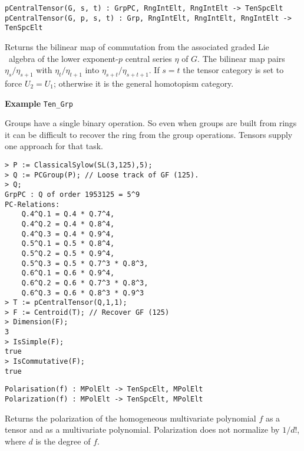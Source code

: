 \color{blue}
{\small \begin{verbatim}
pCentralTensor(G, s, t) : GrpPC, RngIntElt, RngIntElt -> TenSpcElt
pCentralTensor(G, p, s, t) : Grp, RngIntElt, RngIntElt, RngIntElt -> TenSpcElt
\end{verbatim} }
\color{black}

Returns the bilinear map of commutation from the associated graded Lie \
algebra of the lower exponent-$p$ central
series $\eta$ of $G$.  The bilinear map pairs $\eta_s/\eta_{s+1}$ with $
\eta_{t}/\eta_{t+1}$ into $\eta_{s+t}/\eta_{s+t+1}$.  If $s=t$ the tensor 
category is set to force $U_2=U_1$; 
otherwise it is the general homotopism category.

\medskip
\begin{framed} {\bf Example} {\tt Ten\_Grp}\\
{\small
Groups have a single binary operation. So even when groups are built from
rings it can be difficult to recover the ring from the group operations.  Tensors
supply one approach for that task.
\begin{lstlisting}[frame=single,basicstyle=\ttfamily\color{black!30!
teal},backgroundcolor=\color{white!70!gray}]
> P := ClassicalSylow(SL(3,125),5);
> Q := PCGroup(P); // Loose track of GF (125).
> Q;
GrpPC : Q of order 1953125 = 5^9
PC-Relations:
    Q.4^Q.1 = Q.4 * Q.7^4, 
    Q.4^Q.2 = Q.4 * Q.8^4, 
    Q.4^Q.3 = Q.4 * Q.9^4, 
    Q.5^Q.1 = Q.5 * Q.8^4, 
    Q.5^Q.2 = Q.5 * Q.9^4, 
    Q.5^Q.3 = Q.5 * Q.7^3 * Q.8^3, 
    Q.6^Q.1 = Q.6 * Q.9^4, 
    Q.6^Q.2 = Q.6 * Q.7^3 * Q.8^3, 
    Q.6^Q.3 = Q.6 * Q.8^3 * Q.9^3
> T := pCentralTensor(Q,1,1);
> F := Centroid(T); // Recover GF (125)
> Dimension(F);
3
> IsSimple(F);
true
> IsCommutative(F);
true
\end{lstlisting}
}
\end{framed}


\color{blue}
{\small \begin{verbatim}
Polarisation(f) : MPolElt -> TenSpcElt, MPolElt
Polarization(f) : MPolElt -> TenSpcElt, MPolElt
\end{verbatim} }
\color{black}

Returns the polarization of the homogeneous multivariate polynomial 
$f$ as a tensor and as a multivariate polynomial.  Polarization does not
normalize by $1/d!$, where $d$ is the degree of $f$.  

